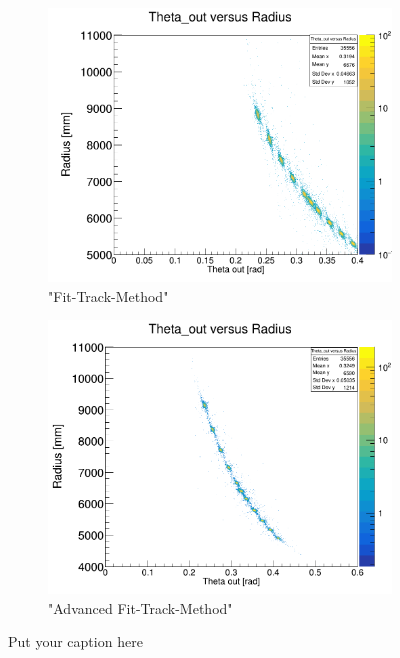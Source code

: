 \documentclass[12pt, letterpaper]{article}
\begin{document}
\begin{figure}[!htbp]
\begin{subfigure}{.5\textwidth}
\end{subfigure}
\begin{subfigure}{.5\textwidth}
  \centering
  \includegraphics[width=.9\linewidth]{plot_imgs/theta_out_rho_fit.png} 
  \caption{"Fit-Track-Method"}
  \label{fig:sub-second}
\end{subfigure}
\begin{subfigure}{.5\textwidth}
  \centering
  \includegraphics[width=.9\linewidth]{plot_imgs/theta_out_rho_last.png} 
  \caption{"Advanced Fit-Track-Method"}
  \label{fig:sub-second}
\end{subfigure}
\caption{Put your caption here}
\label{fig:fig}
\end{figure}
\FloatBarrier
\clearpage
\end{document}
